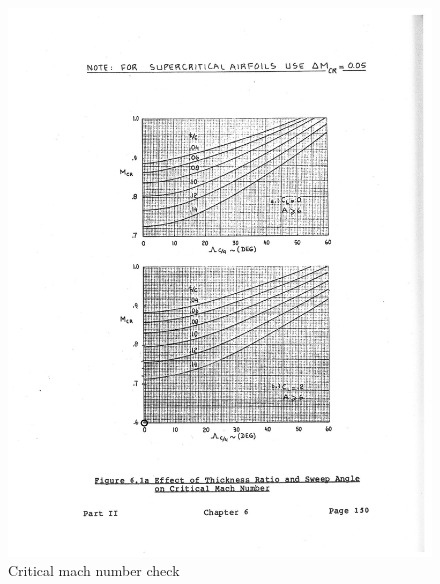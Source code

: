 \documentclass[conf]{new-aiaa}
\begin{document}
\begin{figure}[H]
    \centering
    \includegraphics[width=\textwidth]{plots/Mcr_check}
    \caption{Critical mach number check}
    \label{fig:Mcr_check}
\end{figure}
\end{document}
